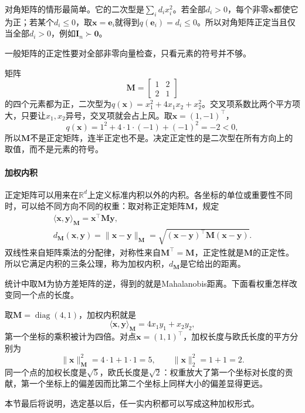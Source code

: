 对角矩阵的情形最简单。它的二次型是$\sum_id_ix_i^2$。若全部$d_i>0$，每个非零$\bm x$都使它为正；若某个$d_i\leq0$，取$\bm x=\bm e_i$就得到$q(\bm e_i)=d_i\leq0$。所以对角矩阵正定当且仅当全部$d_i>0$，例如$\bm I_n\succ\bm0$。

一般矩阵的正定性要对全部非零向量检查，只看元素的符号并不够。
\begin{example}[反例：元素全为正的对称矩阵未必正定]
\label{ex:ls-positive-entries-not-pd}
矩阵
\[
 \bm M=\begin{bmatrix}1&2\\2&1\end{bmatrix}
\]
的四个元素都为正，二次型为$q(\bm x)=x_1^2+4x_1x_2+x_2^2$。交叉项系数比两个平方项大，只要让$x_1,x_2$异号，交叉项就会占上风。取$\bm x=(1,-1)^\top$，
\[
 q(\bm x)=1^2+4\cdot1\cdot(-1)+(-1)^2=-2<0,
\]
所以$\bm M$不是正定矩阵，连半正定也不是。决定正定性的是二次型在所有方向上的取值，而不是元素的符号。
\end{example}

\paragraph{加权内积}
\label{sec:ls-weighted-inner-products}
正定矩阵可以用来在$\mathbb R^d$上定义标准内积以外的内积。各坐标的单位或重要性不同时，可以给不同方向不同的权重：取对称正定矩阵$\bm M$，规定
\begin{equation}
\begin{gathered}
\langle\bm x,\bm y\rangle_{\bm M}=\bm x^\top\bm M\bm y,\\
d_{\bm M}(\bm x,\bm y)=\lVert\bm x-\bm y\rVert_{\bm M}=\sqrt{(\bm x-\bm y)^\top\bm M(\bm x-\bm y)}.
\end{gathered}
\label{eq:linear-algebra-mahalanobis-pseudodistance}
\end{equation}
双线性来自矩阵乘法的分配律，对称性来自$\bm M^\top=\bm M$，正定性就是$\bm M$的正定性。所以它满足内积的三条公理，称为加权内积，$d_{\bm M}$是它给出的距离。

统计中取$\bm M$为协方差矩阵的逆，得到的就是Mahalanobis距离。下面看权重怎样改变同一个点的长度。
\begin{example}[加权内积下的长度]
\label{ex:ls-weighted-length}
取$\bm M=\operatorname{diag}(4,1)$，加权内积就是
\[
 \langle\bm x,\bm y\rangle_{\bm M}=4x_1y_1+x_2y_2,
\]
第一个坐标的乘积被计为四倍。对点$\bm x=(1,1)^\top$，加权长度与欧氏长度的平方分别为
\[
 \lVert\bm x\rVert_{\bm M}^2=4\cdot1+1\cdot1=5,\qquad\lVert\bm x\rVert_2^2=1+1=2.
\]
同一个点的加权长度是$\sqrt5$，欧氏长度是$\sqrt2$：权重放大了第一个坐标对长度的贡献，第一个坐标上的偏差因而比第二个坐标上同样大小的偏差显得更远。
\end{example}
本节最后将说明，选定基以后，任一实内积都可以写成这种加权形式。


